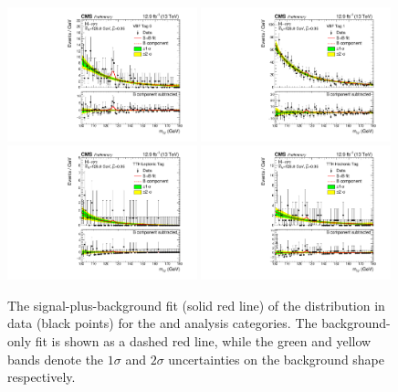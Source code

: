 \begin{figure}[hpt!]
\centering
\includegraphics[width=0.49\textwidth]{statandresultsFigures/S_SB_ProfileMH_VBFTag_0_13TeV.pdf} 
\includegraphics[width=0.49\textwidth]{statandresultsFigures/S_SB_ProfileMH_VBFTag_1_13TeV.pdf} 
\includegraphics[width=0.49\textwidth]{statandresultsFigures/S_SB_ProfileMH_TTHLeptonicTag_13TeV.pdf} 
\includegraphics[width=0.49\textwidth]{statandresultsFigures/S_SB_ProfileMH_TTHHadronicTag_13TeV.pdf} \\
\caption{The signal-plus-background fit (solid red line) of the \mgg distribution in data (black points) for the \VBFTag and \TTHTag analysis categories. The background-only fit is shown as a dashed red line, while the green and yellow bands denote the $1\sigma$ and $2\sigma$ uncertainties on the background shape respectively.}


\end{figure}
